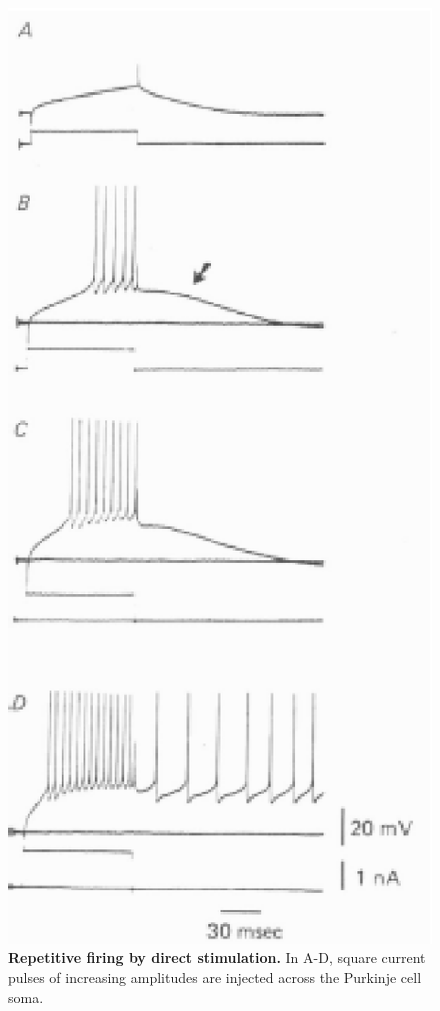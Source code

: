 \documentclass[12pt]{article}
\begin{document}
\begin{figure}[h]
\centering
   \includegraphics[scale=1]{figures/Fig.4.eps}
   \caption{{\bf Repetitive firing by direct stimulation.} In A-D, square current pulses of increasing amplitudes are injected across the Purkinje cell soma.}
   \label{fig:L3}
\end{figure}
\end{document}
